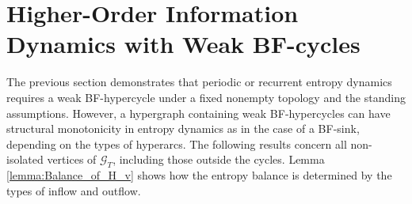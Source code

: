 \documentclass{comnet}%
\begin{document}
\section{\label{sec:ID_of_Single_Cycle}Higher-Order Information Dynamics with Weak BF-cycles}

The previous section demonstrates that periodic or recurrent entropy dynamics requires a weak BF-hypercycle under a fixed nonempty topology and the standing assumptions. However, a hypergraph containing weak BF-hypercycles can have structural monotonicity in entropy dynamics as in the case of a BF-sink, depending on the types of hyperarcs. The following results concern all non-isolated vertices of $\mathcal G_T$, including those outside the cycles. Lemma \ref{lemma:Balance_of_H_v} shows how the entropy balance is determined by the types of inflow and outflow.\\
\end{document}
